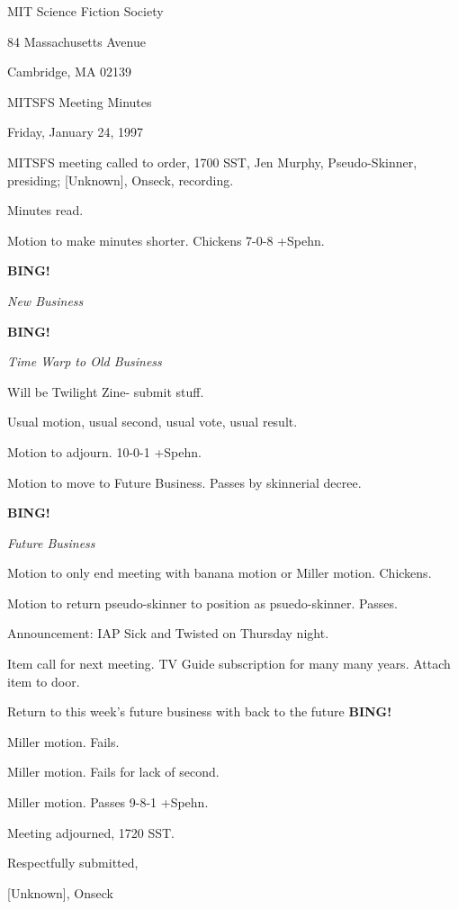 \documentclass[12pt]{article}
\newcommand{\bing}{{\bf BING!} }
\newcommand{\goto}[1]{\bing \vskip 12pt \centerline{{\em{#1}}}}
\begin{document}
\begin{center}

MIT Science Fiction Society 

84 Massachusetts Avenue

Cambridge, MA 02139

\vspace{12pt}

MITSFS Meeting Minutes 

Friday, January 24, 1997

\end{center}
 
\vspace{18pt}

\setlength{\parskip}{6pt}

\noindent
MITSFS meeting called to order, 1700 SST,
Jen Murphy, Pseudo-Skinner, presiding; [Unknown], Onseck, recording.

Minutes read.

Motion to make minutes shorter. Chickens 7-0-8 +Spehn.

\goto{New Business}

\goto{Time Warp to Old Business}

Will be Twilight Zine- submit stuff.

Usual motion, usual second, usual vote, usual result.

Motion to adjourn. 10-0-1 +Spehn.

Motion to move to Future Business. Passes by skinnerial decree.

\goto{Future Business}

Motion to only end meeting with banana motion or Miller motion. Chickens.

Motion to return pseudo-skinner to position as psuedo-skinner. Passes.

Announcement: IAP Sick and Twisted on Thursday night.

Item call for next meeting. TV Guide subscription for many many years. Attach item to door.

Return to this week's future business with back to the future \bing

Miller motion. Fails.

Miller motion. Fails for lack of second.

Miller motion. Passes 9-8-1 +Spehn.

\vspace{12pt}

\noindent
Meeting adjourned, 1720 SST.

\vspace{18pt}

\centerline{Respectfully submitted,}
\centerline{[Unknown], Onseck}
\end{document}
